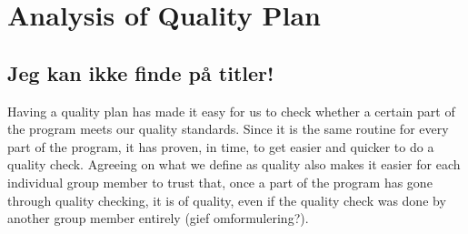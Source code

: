 \section{Analysis of Quality Plan}
\subsection{Jeg kan ikke finde på titler!}
Having a quality plan has made it easy for us to check whether a certain part of the program meets our quality standards. Since it is the same routine for every part of the program, it has proven, in time, to get easier and quicker to do a quality check. Agreeing on what we define as quality also makes it easier for each individual group member to trust that, once a part of the program has gone through quality checking, it is of quality, even if the quality check was done by another group member entirely (gief omformulering?).